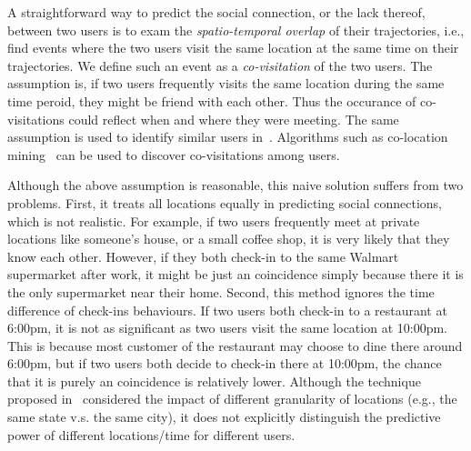 A straightforward way to predict the social connection, or the lack thereof, between two users is to exam the \textit{spatio-temporal overlap} of their trajectories, i.e., find events where the two users visit the same location at the same time on their trajectories. We define such an event as a \textit{co-visitation} of the two users. The assumption is, if two users frequently visits the same location during the same time peroid, they might be friend with each other. Thus the occurance of co-visitations could reflect when and where they were meeting. The same assumption is used to identify similar users in~\cite{xiao2010finding}. Algorithms such as co-location mining~\cite{weiler2015geo} can be used to discover co-visitations among users. 

Although the above assumption is reasonable, this naive solution suffers from two problems. First, it treats all locations equally in predicting social connections, which is not realistic. For example, if two users frequently meet at private locations like someone's house, or a small coffee shop, it is very likely that they know each other. However, if they both check-in to the same Walmart supermarket after work, it might be just an coincidence simply because there it is the only supermarket near their home. Second, this method ignores the time difference of check-ins behaviours. If two users both check-in to a restaurant at 6:00pm, it is not as significant as two users visit the same location at 10:00pm. This is because most customer of the restaurant may choose to dine there around 6:00pm, but if two users both decide to check-in there at 10:00pm, the chance that it is purely an coincidence is relatively lower. Although the technique proposed in~\cite{xiao2010finding} considered the impact of different granularity of locations (e.g., the same state v.s. the same city), it does not explicitly distinguish the predictive power of different locations/time for different users.

